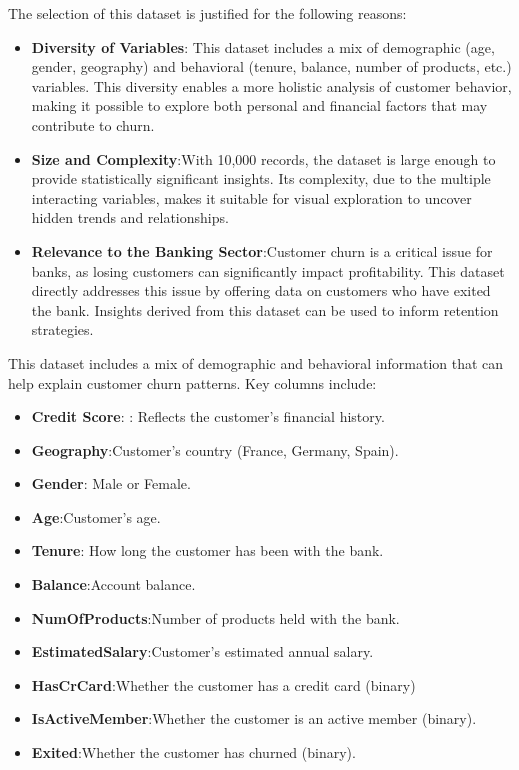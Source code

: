 \documentclass[12pt]{article}
\begin{document}
The selection of this dataset is justified for the following reasons:

\begin{itemize}
    \item \textbf{ Diversity of Variables}: This dataset includes a mix of demographic (age, gender, geography) and behavioral (tenure, balance, number of products, etc.) variables. This diversity enables a more holistic analysis of customer behavior, making it possible to explore both personal and financial factors that may contribute to churn.
    \item \textbf{ Size and Complexity}:With 10,000 records, the dataset is large enough to provide statistically significant insights. Its complexity, due to the multiple interacting variables, makes it suitable for visual exploration to uncover hidden trends and relationships.
    \item \textbf{ Relevance to the Banking Sector}:Customer churn is a critical issue for banks, as losing customers can significantly impact profitability. This dataset directly addresses this issue by offering data on customers who have exited the bank. Insights derived from this dataset can be used to inform retention strategies.
\end{itemize}

This dataset includes a mix of demographic and behavioral information that can help explain customer churn patterns. Key columns include:

\begin{itemize}
    \item \textbf{ Credit Score}: : Reflects the customer’s financial history.
    \item \textbf{Geography}:Customer’s country (France, Germany, Spain).
    \item \textbf{ Gender}: Male or Female.
    \item \textbf{Age}:Customer’s age.
    \item \textbf{Tenure}: How long the customer has been with the bank.
    \item \textbf{Balance}:Account balance.
    \item \textbf{NumOfProducts}:Number of products held with the bank.
    \item \textbf{EstimatedSalary}:Customer’s estimated annual salary.
    \item \textbf{HasCrCard}:Whether the customer has a credit card (binary)
    \item \textbf{IsActiveMember}:Whether the customer is an active member (binary).
    \item \textbf{Exited}:Whether the customer has churned (binary).
\end{itemize}
\end{document}
